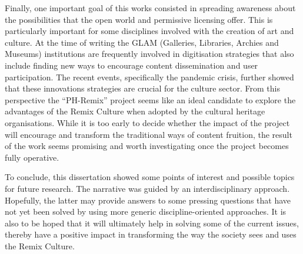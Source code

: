 Finally, one important goal of this works consisted in spreading awareness about the possibilities that the open world and permissive licensing offer. This is particularly important for some disciplines involved with the creation of art and culture. At the time of writing the GLAM (Galleries, Libraries, Archies and Museums) institutions are frequently involved in digitisation strategies that also include finding new ways to encourage content dissemination and user participation. The recent events, specifically the pandemic crisis, further showed that these innovations strategies are crucial for the culture sector.
From this perspective the “PH-Remix” project seems like an ideal candidate to explore the advantages of the Remix Culture when adopted by the cultural heritage organisations. While it is too early to decide whether the impact of the project will encourage and transform the traditional ways of content fruition, the result of the work seems promising and worth investigating once the project becomes fully operative.

To conclude, this dissertation showed some points of interest and possible topics for future research. The narrative was guided by an interdisciplinary approach. Hopefully, the latter may provide answers to some pressing questions that have not yet been solved by using more generic discipline-oriented approaches. It is also to be hoped that it will ultimately help in solving some of the current issues, thereby have a positive impact in transforming the way the society sees and uses the Remix Culture.
